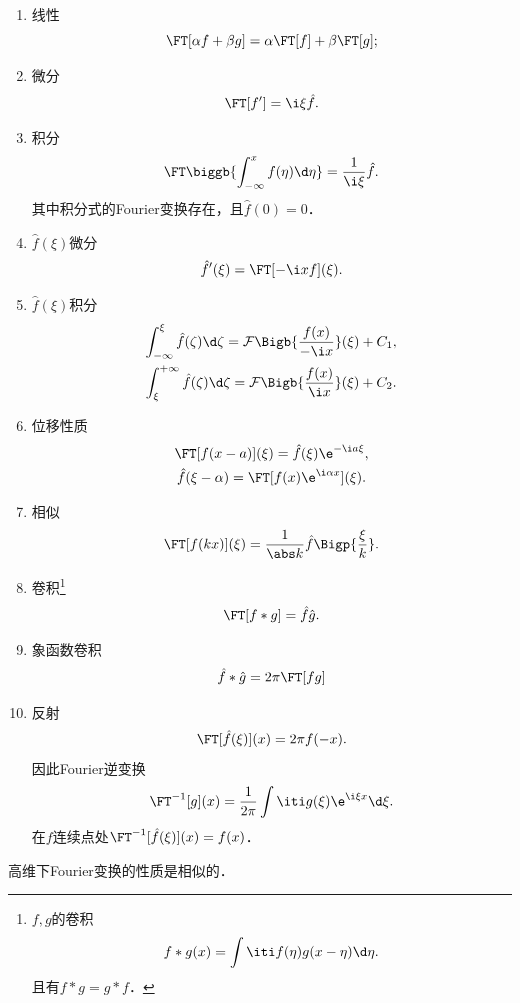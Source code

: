 \begin{enumerate}
	\item 线性
		\[
			\FT[\alpha f+\beta g]=\alpha\FT[f]+\beta\FT[g];
		\]
	\item 微分
		\[
			\FT[f']=\i\xi\hat f.
		\]
	\item 积分
		\[
			\FT\biggb{\int_{-\infty}^xf(\eta)\d\eta}=\frac1{\i\xi}\hat f.
		\]
		其中积分式的Fourier变换存在，且$\hat f(0)=0$．
	\item $\hat f(\xi)$微分
		\[
			\hat f'(\xi)=\FT[-\i xf](\xi).
		\]
	\item $\hat f(\xi)$积分
			\begin{gather}
				\int_{-\infty}^\xi\hat f(\zeta)\d\zeta=\mathcal F\Bigb{\frac{f(x)}{-\i x}}(\xi)+C_1,\\
				\int_\xi^{+\infty}\hat f(\zeta)\d\zeta=\mathcal F\Bigb{\frac{f(x)}{\i x}}(\xi)+C_2.
			\end{gather}
	\item 位移性质
			\begin{gather*}
				\FT[f(x-a)](\xi)=\hat f(\xi)\e^{-\i a\xi},\\
				\hat f(\xi-\alpha)=\FT[f(x)\e^{\i\alpha x}](\xi).
			\end{gather*}
	\item 相似
			\[\FT[f(kx)](\xi)=\frac1{\abs k}\hat f\Bigp{\frac\xi{k}}.\]
	\item 卷积\footnote{$f,g$的卷积\[f\ast g(x)=\int\iti f(\eta)g(x-\eta)\d\eta.\]且有$f\ast g=g\ast f$．}
			\[\FT[f\ast g]=\hat f\hat g.\]
	\item 象函数卷积
			\[\hat f\ast\hat g=2\pi\FT[fg]\]
	\item 反射
			\[\FT[\hat f(\xi)](x)=2\pi f(-x).\]
			因此Fourier逆变换
			\[\FT^{-1}[g](x)=\frac1{2\pi}\int\iti g(\xi)\e^{\i\xi x}\d\xi.\]
			在$f$连续点处$\FT^{-1}[\hat f(\xi)](x)=f(x)$．
\end{enumerate}
高维下Fourier变换的性质是相似的．
